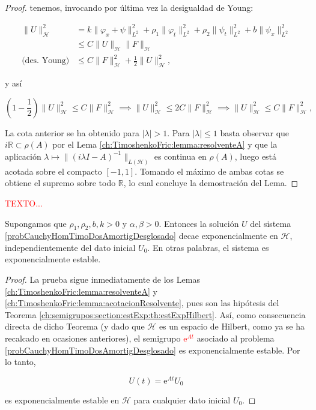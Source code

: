 \begin{proof}
    tenemos, invocando por última vez la desigualdad de Young:

    \begin{align*}
        \lVert U \rVert_{\mathcal{H}}^2 &= k\lVert\varphi_x + \psi \rVert_{L^2}^2 + \rho_1 \lVert \varphi_t \rVert_{L^2}^2 + \rho_2 \lVert \psi_t \rVert_{L^2}^2 + b \lVert \psi_x \rVert_{L^2}^2\\
        &\leq C \lVert U \rVert_{\mathcal{H}} \lVert F \rVert_{\mathcal{H}}\\
        \text{(des. Young)} &\leq C \lVert F \rVert_{\mathcal{H}}^2 + \frac{1}{2}\lVert U \rVert_{\mathcal{H}}^2,
    \end{align*}

    y así

    \[\left(1-\frac{1}{2} \right)\lVert U \rVert_{\mathcal{H}}^2 \leq C \lVert F \rVert_{\mathcal{H}}^2 \implies \lVert U \rVert_{\mathcal{H}}^2 \leq 2C \lVert F \rVert_{\mathcal{H}}^2 \implies \lVert U \rVert_{\mathcal{H}}^2 \leq C \lVert F \rVert_{\mathcal{H}}^2,\]

    La cota anterior se ha obtenido para $\lvert \lambda \rvert > 1$. Para
    $\lvert \lambda \rvert \leq 1$ basta observar que $i\mathbb{R} \subset \rho(A)$ por
    el Lema \ref{ch:TimoshenkoFric:lemma:resolventeA} y que la aplicación
    $\lambda \mapsto \lVert (i\lambda I - A)^{-1}\rVert_{L(\mathcal{H})}$ es continua en
    $\rho(A)$, luego está acotada sobre el compacto $[-1,1]$. Tomando el máximo de ambas
    cotas se obtiene el supremo sobre todo $\mathbb{R}$, lo cual concluye la demostración
    del Lema.
\end{proof}

\textcolor{red}{TEXTO...}

\begin{Teorema}
    \label{ch:TimoshenkoFric:th:estExpSG}

    Supongamos que $\rho_1, \rho_2, b, k > 0$ y $\alpha, \beta > 0$. Entonces la solución $U$ del sistema \eqref{probCauchyHomTimoDosAmortigDesglosado} decae exponencialmente en $\mathcal{H}$, independientemente del dato inicial $U_0$. En otras palabras, el sistema es exponencialmente estable.
\end{Teorema}

\begin{proof}
    La prueba sigue inmediatamente de los Lemas \ref{ch:TimoshenkoFric:lemma:resolventeA} y \ref{ch:TimoshenkoFric:lemma:acotacionResolvente}, pues son las hipótesis del Teorema \ref{ch:semigrupos:section:estExp:th:estExpHilbert}. Así, como consecuencia directa de dicho Teorema (y dado que $\mathcal{H}$ es un espacio de Hilbert, como ya se ha recalcado en ocasiones anteriores), el semigrupo \textcolor{red}{$\mathrm{e}^{At}$} asociado al problema \eqref{probCauchyHomTimoDosAmortigDesglosado} es exponencialmente estable. Por lo tanto, 

    \[U(t) = \mathrm{e}^{At}U_0\]

    es exponencialmente estable en $\mathcal{H}$ para cualquier dato inicial $U_0$.
\end{proof}

